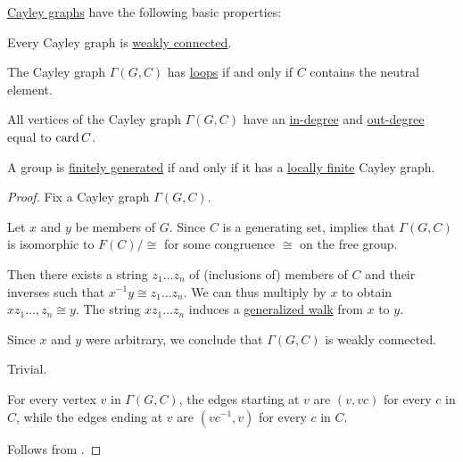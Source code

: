 \begin{proposition}\label{thm:def:cayley_graph}
  \hyperref[def:cayley_graph]{Cayley graphs} have the following basic properties:
  \begin{thmenum}
     Every Cayley graph is \hyperref[def:graph_connectedness/weak]{weakly connected}.

     The Cayley graph \( \Gamma(G, C) \) has \hyperref[def:directed_multigraph/loop]{loops} if and only if \( C \) contains the neutral element.

     All vertices of the Cayley graph \( \Gamma(G, C) \) have an \hyperref[def:graph_cardinality/directed_degree]{in-degree} and \hyperref[def:graph_cardinality/directed_degree]{out-degree} equal to \( \operatorname{card} C \).

     A group is \hyperref[def:group_presentation]{finitely generated} if and only if it has a \hyperref[def:graph_cardinality/local]{locally finite} Cayley graph.
  \end{thmenum}
\end{proposition}
\begin{proof}
   Fix a Cayley graph \( \Gamma(G, C) \).

  Let \( x \) and \( y \) be members of \( G \). Since \( C \) is a generating set,  implies that \( \Gamma(G, C) \) is isomorphic to \( F(C) / {\cong} \) for some congruence \( {\cong} \) on the free group.

  Then there exists a string \( z_1 \ldots z_n \) of (inclusions of) members of \( C \) and their inverses such that \( x^{-1} y \cong z_1 \ldots z_n \). We can thus multiply by \( x \) to obtain \( x z_1 \ldots, z_n \cong y \). The string \( x z_1 \ldots z_n \) induces a \hyperref[def:graph_walk/generalized]{generalized walk} from \( x \) to \( y \).

  Since \( x \) and \( y \) were arbitrary, we conclude that \( \Gamma(G, C) \) is weakly connected.

   Trivial.

   For every vertex \( v \) in \( \Gamma(G, C) \), the edges starting at \( v \) are \( (v, vc) \) for every \( c \) in \( C \), while the edges ending at \( v \) are \( (vc^{-1}, v) \) for every \( c \) in \( C \).

   Follows from .
\end{proof}

